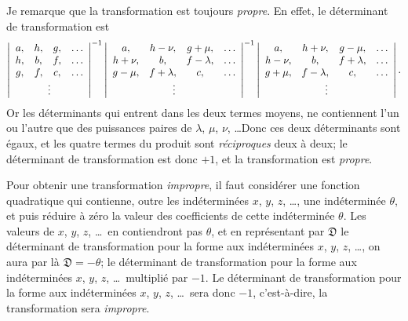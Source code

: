 \documentclass[11pt,a4paper]{article}
\begin{document}
\medskip

Je remarque que la transformation est toujours \textit{propre}. En effet, le d\'eterminant de transformation est
\[
\left\lvert\begin{array}{cccc}
a, & h, & g, & \ldots\\
h, & b, & f, & \ldots\\
g, & f, & c, & \ldots\\
\multicolumn{4}{c}{\vdots}
\end{array}\right\rvert^{-1}
\left\lvert\begin{array}{cccc}
a, & h - \nu, & g + \mu, & \ldots\\
h + \nu, & b, & f - \lambda, & \ldots\\
g - \mu, & f + \lambda, & c, & \ldots\\
\multicolumn{4}{c}{\vdots}
\end{array}\right\rvert^{-1}
\left\lvert\begin{array}{cccc}
a, & h + \nu, & g - \mu, & \ldots\\
h - \nu, & b, & f + \lambda, & \ldots\\
g + \mu, & f - \lambda, & c, & \ldots\\
\multicolumn{4}{c}{\vdots}
\end{array}\right\rvert .
\]
Or les d\'eterminants qui entrent dans les deux termes moyens, ne contiennent l'un ou l'autre que des puissances paires de $\lambda$, $\mu$, $\nu$, \ldots Donc ces deux d\'eterminants sont \'egaux, et les quatre termes du produit sont \textit{r\'eciproques} deux \`a deux; le d\'eterminant de transformation est donc $+1$, et la transformation est \textit{propre}.

\medskip

Pour obtenir une transformation \textit{impropre}, il faut consid\'erer une fonction quadratique qui contienne, outre les ind\'etermin\'ees $x$, $y$, $z$, \ldots, une ind\'etermin\'ee $\theta$, et puis r\'eduire \`a z\'ero la valeur des coefficients de cette ind\'etermin\'ee $\theta$. Les valeurs de $x$, $y$, $z$, \ldots\ en contiendront pas $\theta$, et en repr\'esentant par $\mathfrak{D}$ le d\'eterminant de transformation pour la forme aux ind\'etermin\'ees $x$, $y$, $z$, \ldots, on aura par l\`a $\mathfrak{D} = -\theta$; le d\'eterminant de transformation pour la forme aux ind\'etermin\'ees $x$, $y$, $z$, \ldots\ multipli\'e par $-1$. Le d\'eterminant de transformation pour la forme aux ind\'etermin\'ees $x$, $y$, $z$, \ldots\ sera donc $-1$, c'est-\`a-dire, la transformation sera \textit{impropre}.
\end{document}
